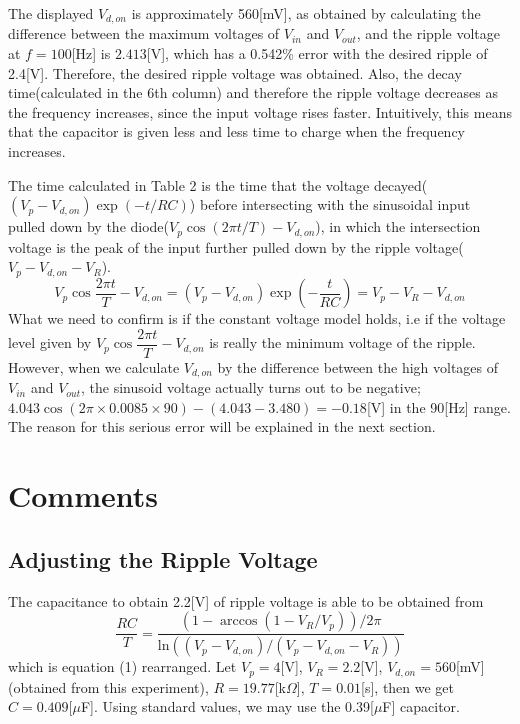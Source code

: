 \documentclass[a4paper, itemph]{oblivoir}
\theoremstyle{definition}
\begin{document}
The displayed $V_{d,on}$ is approximately 560[mV], as obtained by calculating the difference between the maximum voltages of $V_{in}$ and $V_{out}$, and the ripple voltage at $f=100$[Hz] is $2.413$[V], which has a 0.542\% error with the desired ripple of 2.4[V]. Therefore, the desired ripple voltage was obtained. Also, the decay time(calculated in the 6th column) and therefore the ripple voltage decreases as the frequency increases, since the input voltage rises faster. Intuitively, this means that the capacitor is given less and less time to charge when the frequency increases.

The time calculated in Table 2 is the time that the voltage decayed($(V_p-V_{d,on})\exp(-t/RC)$) before intersecting with the sinusoidal input pulled down by the diode($V_p\cos(2\pi t/T)-V_{d,on}$), in which the intersection voltage is the peak of the input further pulled down by the ripple voltage($V_p-V_{d,on}-V_R$).
\begin{equation}
V_p\cos{\frac{2\pi t}{T}}-V_{d,on}=(V_p-V_{d,on})\exp\left(-\frac{t}{RC}\right)=V_p-V_R-V_{d,on}
\end{equation}
What we need to confirm is if the constant voltage model holds, i.e if the voltage level given by $V_p\cos{\dfrac{2\pi t}{T}}-V_{d,on}$ is really the minimum voltage of the ripple. However, when we calculate $V_{d,on}$ by the difference between the high voltages of $V_{in}$ and $V_{out}$, the sinusoid voltage actually turns out to be negative; $4.043\cos{(2\pi\times0.0085\times 90)}-(4.043-3.480)=-0.18$[V] in the 90[Hz] range. The reason for this serious error will be explained in the next section.
\section{Comments}
\subsection{Adjusting the Ripple Voltage}

The capacitance to obtain 2.2[V] of ripple voltage is able to be obtained from
\begin{equation}
\frac{RC}{T}=\frac{\left(1-\arccos{\left(1-V_R/V_p\right)}\right)/2\pi}{\mathrm{ln}\left((V_p-V_{d,on})/(V_p-V_{d,on}-V_R)\right)}
\end{equation}
which is equation (1) rearranged. Let $V_p=4$[V], $V_R=2.2$[V], $V_{d,on}=560$[mV](obtained from this experiment), $R=19.77$[k$\Omega$], $T=0.01$[s], then we get $C=0.409$[$\mu$F]. Using standard values, we may use the 0.39[$\mu$F] capacitor.
\end{document}
